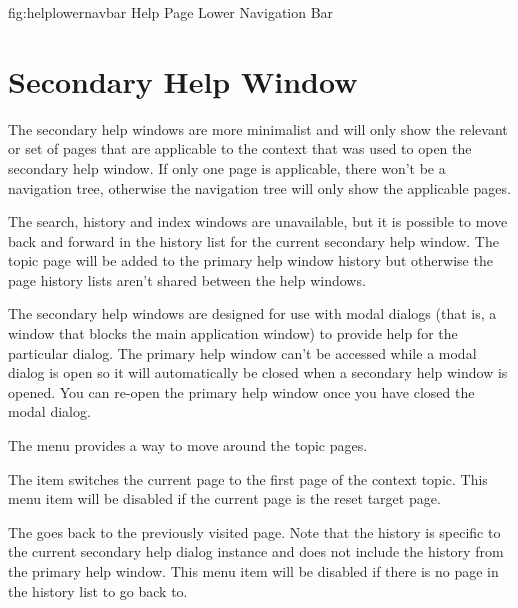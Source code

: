 \FloatFig
{fig:helplowernavbar}
{%
}
{Help Page Lower Navigation Bar}

\section{Secondary Help Window}
\label{sec:secondaryhelp}

The secondary help windows are more minimalist and will only show
the relevant  or set of pages that are applicable to
the context that was used to open the secondary help window. If only
one page is applicable, there won't be a navigation tree, otherwise
the navigation tree will only show the applicable pages.

The search, history and index windows are unavailable, but it is
possible to move back and forward in the history list for the
current secondary help window. The topic page will be added to the
primary help window history but otherwise the page history lists
aren't shared between the help windows.

The secondary help windows are designed for use with modal dialogs
(that is, a window that blocks the main application window)
to provide help for the particular dialog. The primary help window
can't be accessed while a modal dialog is open so it will
automatically be closed when a secondary help window is opened.
You can re-open the primary help window once you have closed the
modal dialog.


The  menu provides a way to move around
the topic pages.


The  item switches the current
page to the first page of the context topic. This menu item
will be disabled if the current page is the reset target page.


The  goes back to the
previously visited page. Note that the history is specific to the
current secondary help dialog instance and does not include the history
from the primary help window. This menu item will be disabled if
there is no page in the history list to go back to.


